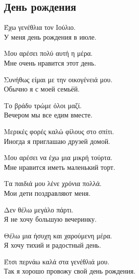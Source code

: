 \documentclass[12pt]{article}
\newcommand{\my}[1]{\textcolor{gray!80!white}{#1}}
\newenvironment{page}{\clearpage\normalsize\null\vfill}{\vfill\null}
\newenvironment{textblock}{\begin{minipage}{\textwidth}}{\end{minipage}\smallskip}
\begin{document}
	\begin{page}
		\subsection{День рождения}
		\small
		\begin{textblock}
			Έχω γενέθλια τον Ιούλιο.\\
			\my{У меня день рождения в июле.}
			
			Μου αρέσει πολύ αυτή η μέρα.\\
			\my{Мне очень нравится этот день.}
			
			Συνήθως είμαι με την οικογένειά μου.\\
			\my{Обычно я с моей семьёй.}
			
			Το βράδυ τρώμε όλοι μαζί.\\
			\my{Вечером мы все едим вместе.}
			
			Μερικές φορές καλώ φίλους στο σπίτι.\\
			\my{Иногда я приглашаю друзей домой.}
			
			Μου αρέσει να έχω μια μικρή τούρτα.\\
			\my{Мне нравится иметь маленький торт.}
			
			Τα παιδιά μου λένε χρόνια πολλά.\\
			\my{Мои дети поздравляют меня.}
			
			Δεν θέλω μεγάλο πάρτι.\\
			\my{Я не хочу большую вечеринку.}
			
			Θέλω μια ήσυχη και χαρούμενη μέρα.\\
			\my{Я хочу тихий и радостный день.}
			
			Έτσι περνάω καλά στα γενέθλιά μου.\\
			\my{Так я хорошо провожу свой день рождения.}
		\end{textblock}
	\end{page}
	
\end{document}
